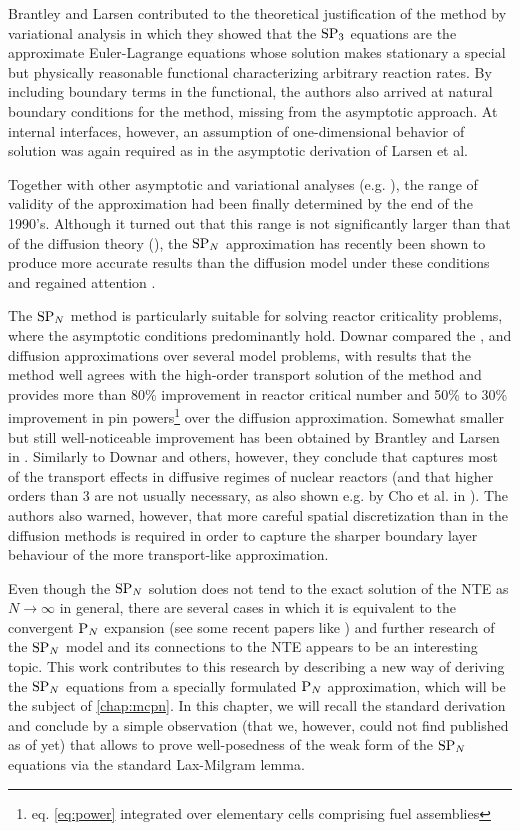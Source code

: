 Brantley and Larsen \cite{Brantley1} contributed to the theoretical justification of the method by
variational analysis in which they showed that the $\SPN[3]$ equations are the approximate Euler-Lagrange equations
whose solution makes stationary a special but physically reasonable functional characterizing arbitrary reaction rates. By
including boundary terms in the functional, the authors also arrived at natural boundary conditions for the method,
missing from the asymptotic approach. At internal interfaces, however, an assumption of one-dimensional behavior of
solution was again required as in the asymptotic derivation of Larsen et al.

Together with other asymptotic and variational analyses (e.g. \cite{Pomraning1}), the range of validity of the
approximation had been finally determined by the end of the 1990's. Although it turned out that this range is not
significantly larger than that of the diffusion theory (\cite{Larsen1}), the $\SPN$ approximation has recently been shown to produce more 
accurate results than the diffusion model under these conditions and regained attention
\cite{Frank1,McClarren1,Ragusa1,Larsen3,Kirschenmann1,Olbrant}.

The $\SPN$ method is particularly suitable for solving reactor criticality problems, where the asymptotic conditions
predominantly hold. Downar \cite{Downar} compared the \SN[16], \SPN[3] and diffusion approximations over several model
problems, with results that the \SPN[3] method well agrees with the high-order transport solution of the \SN[16] method
and provides more than 80\% improvement in reactor critical number and 50\% to 30\% improvement in pin
powers\footnote{eq. \eqref{eq:power} integrated over elementary cells comprising fuel assemblies} over the diffusion
approximation.
Somewhat smaller but still well-noticeable improvement has been obtained by Brantley and Larsen in \cite{Brantley1}.
Similarly to Downar and others, however, they conclude that \SPN[3] captures most of the transport effects in diffusive
regimes of nuclear reactors (and that higher orders than 3 are not usually necessary, as also shown e.g. by Cho et al.
in \cite{ChoAxialSPN}).
The authors also warned, however, that more careful spatial discretization than in the
diffusion methods is required in order to capture the sharper boundary layer behaviour of the more transport-like
\SPN[3] approximation.

Even though the $\SPN$ solution does not tend to the
exact solution of the NTE as $N\to\infty$ in general, there are several cases in which it is equivalent to the
convergent $\PN$ expansion (see some recent papers like \cite{Coppa2,McClarren2,Larsen2}) and further research of the
$\SPN$ model and its connections to the NTE appears to be an interesting topic. This work contributes to this research
by describing a new way of deriving the $\SPN$ equations from a specially formulated $\PN$ approximation, which will be
the subject of \cref{chap:mcpn}. In this chapter, we will recall the standard derivation and conclude by a simple observation (that
we, however, could not find published as of yet) that allows to prove well-posedness of the weak form of the $\SPN$
equations via the standard Lax-Milgram lemma. 

